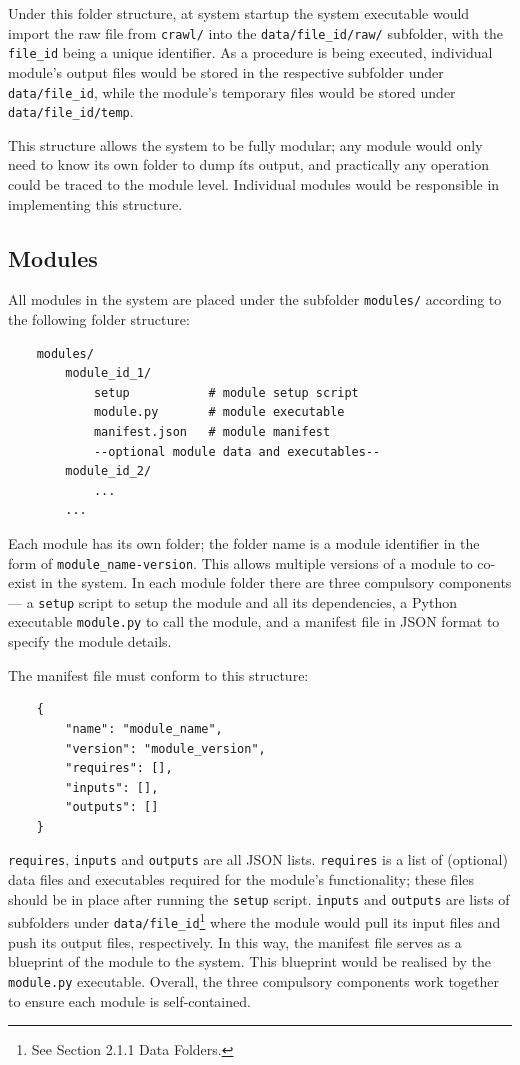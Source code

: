 Under this folder structure, at system startup the system executable would
import the raw file from \texttt{crawl/} into the \texttt{data/file\_id/raw/}
subfolder, with the \texttt{file\_id} being a unique identifier. As a procedure
is being executed, individual module's output files would be stored in the
respective subfolder under \texttt{data/file\_id}, while the module's temporary
files would be stored under \texttt{data/file\_id/temp}.

This structure allows the system to be fully modular; any module would only need
to know its own folder to dump íts output, and practically any operation could
be traced to the module level. Individual modules would be responsible in
implementing this structure.

\subsection{Modules}

All modules in the system are placed under the subfolder \texttt{modules/}
according to the following folder structure:

\begin{lstlisting}
    modules/
        module_id_1/
            setup           # module setup script
            module.py       # module executable
            manifest.json   # module manifest
            --optional module data and executables--
        module_id_2/
            ...
        ...            
\end{lstlisting}

Each module has its own folder; the folder name is a module identifier in
the form of \texttt{module\_name-version}. This allows multiple versions of
a module to co-exist in the system. In each module folder there are three
compulsory components --- a \texttt{setup} script to setup the module and all
its dependencies, a Python executable \texttt{module.py} to call the module,
and a manifest file in JSON format to specify the module details.

The manifest file must conform to this structure:

\begin{lstlisting}
    {
        "name": "module_name",
        "version": "module_version",
        "requires": [],
        "inputs": [],
        "outputs": []
    }
\end{lstlisting}

\texttt{requires}, \texttt{inputs} and \texttt{outputs} are all JSON lists.
\texttt{requires} is a list of (optional) data files and executables required
for the module's functionality; these files should be in place after running
the \texttt{setup} script. \texttt{inputs} and \texttt{outputs} are lists of
subfolders under \texttt{data/file\_id}\footnote{See Section 2.1.1 Data Folders.}
where the module would pull its input files and push its output files, respectively.
In this way, the manifest file serves as a blueprint of the module to the system.
This blueprint would be realised by the \texttt{module.py} executable. Overall,
the three compulsory components work together to ensure each module is self-contained.

